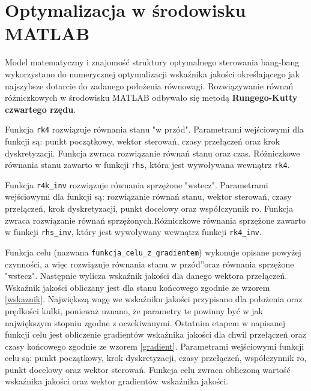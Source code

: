 \section{Optymalizacja w środowisku \textsc{MATLAB}}

Model matematyczny i znajomość struktury optymalnego sterowania bang-bang wykorzystano do numerycznej optymalizacji wskaźnika jakości określającego jak najszybsze dotarcie do zadanego położenia równowagi.
Rozwiązywanie równań różniczkowych w środowisku MATLAB odbywało się metodą \textbf{Rungego-Kutty czwartego rzędu}. 

Funkcja \texttt{rk4} rozwiązuje równania stanu "w przód". Parametrami wejściowymi dla funkcji są: punkt początkowy,
wektor sterowań, czasy przełączeń oraz krok dyskretyzacji. Funkcja zwraca rozwiązanie równań stanu oraz
czas. Różniczkowe równania stanu zawarto w funkcji \texttt{rhs}, która jest wywoływana wewnątrz \texttt{rk4}.

Funkcja \texttt{r4k\_inv} rozwiązuje równania sprzężone "wstecz". Parametrami wejściowymi dla funkcji są: rozwiązanie
równań stanu, wektor sterowań, czasy przełączeń, krok dyskretyzacji, punkt docelowy oraz współczynnik ro.
Funkcja zwraca rozwiązanie równań sprzężonych.Różniczkowe równania sprzężone zawarto w funkcji \texttt{rhs\_inv}, 
który jest wywoływany wewnątrz funkcji \texttt{rk4\_inv}.

Funkcja celu (nazwana \texttt{funkcja\_celu\_z\_gradientem}) wykonuje opisane powyżej czynności, a więc rozwiązuje 
równania stanu \quotedblbase w przód\textquotedblright oraz równania sprzężone "wstecz". Następnie wylicza wskaźnik jakości dla danego 
wektora przełączeń. Wskaźnik jakości obliczany jest dla stanu końcowego zgodnie ze wzorem \ref{wskaznik}. 
Największą wagę we wskaźniku jakości przypisano dla położenia oraz prędkości kulki, ponieważ uznano, że 
parametry te powinny być w jak największym stopniu zgodne z oczekiwanymi. Ostatnim etapem w napisanej 
funkcji celu jest obliczenie gradientów wskaźnika jakości dla chwil przełączeń oraz czasy końcowego
zgodnie ze wzorem \ref{gradient}. Parametrami wejściowymi funkcji celu są: punkt początkowy, krok dyskretyzacji,
czasy przełączeń, współczynnik ro, punkt docelowy oraz wektor sterowań. Funkcja celu zwraca obliczoną
wartość wskaźnika jakości oraz wektor gradientów wskaźnika jakości.



